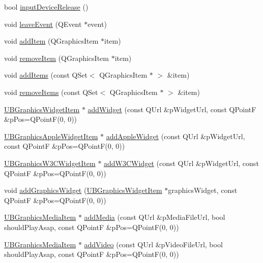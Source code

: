 \begin{DoxyCompactItemize}
\item 
bool \hyperlink{class_u_b_graphics_scene_a6e04dca4d1484c4e44cc63c8a5b0e2da}{input\-Device\-Release} ()
\item 
void \hyperlink{class_u_b_graphics_scene_ad531983c966ef07c7dde8cebf8cf3903}{leave\-Event} (Q\-Event $\ast$event)
\item 
void \hyperlink{class_u_b_graphics_scene_a546b3015e60c63f2ef0e72fed5e4eb35}{add\-Item} (Q\-Graphics\-Item $\ast$item)
\item 
void \hyperlink{class_u_b_graphics_scene_a769a40e7bebcaf040e391eed5f5d3f56}{remove\-Item} (Q\-Graphics\-Item $\ast$item)
\item 
void \hyperlink{class_u_b_graphics_scene_a18bf3af9f52c9deb3149d9b82409cc02}{add\-Items} (const Q\-Set$<$ Q\-Graphics\-Item $\ast$ $>$ \&item)
\item 
void \hyperlink{class_u_b_graphics_scene_a51dd0fbb2c591323cddfcc14972b8594}{remove\-Items} (const Q\-Set$<$ Q\-Graphics\-Item $\ast$ $>$ \&item)
\item 
\hyperlink{class_u_b_graphics_widget_item}{U\-B\-Graphics\-Widget\-Item} $\ast$ \hyperlink{class_u_b_graphics_scene_aff586f570c8625a51bccef943662a29d}{add\-Widget} (const Q\-Url \&p\-Widget\-Url, const Q\-Point\-F \&p\-Pos=Q\-Point\-F(0, 0))
\item 
\hyperlink{class_u_b_graphics_apple_widget_item}{U\-B\-Graphics\-Apple\-Widget\-Item} $\ast$ \hyperlink{class_u_b_graphics_scene_aa86ec061e79ba18c2efe73a6bf10bf33}{add\-Apple\-Widget} (const Q\-Url \&p\-Widget\-Url, const Q\-Point\-F \&p\-Pos=Q\-Point\-F(0, 0))
\item 
\hyperlink{class_u_b_graphics_w3_c_widget_item}{U\-B\-Graphics\-W3\-C\-Widget\-Item} $\ast$ \hyperlink{class_u_b_graphics_scene_acb26de2926454faf9c5ca66989779d82}{add\-W3\-C\-Widget} (const Q\-Url \&p\-Widget\-Url, const Q\-Point\-F \&p\-Pos=Q\-Point\-F(0, 0))
\item 
void \hyperlink{class_u_b_graphics_scene_aa63a9c1b5eb1de5a0d06a0f2b449648a}{add\-Graphics\-Widget} (\hyperlink{class_u_b_graphics_widget_item}{U\-B\-Graphics\-Widget\-Item} $\ast$graphics\-Widget, const Q\-Point\-F \&p\-Pos=Q\-Point\-F(0, 0))
\item 
\hyperlink{class_u_b_graphics_media_item}{U\-B\-Graphics\-Media\-Item} $\ast$ \hyperlink{class_u_b_graphics_scene_a02401493ef5bda150a808a6a92223386}{add\-Media} (const Q\-Url \&p\-Media\-File\-Url, bool should\-Play\-Asap, const Q\-Point\-F \&p\-Pos=Q\-Point\-F(0, 0))
\item 
\hyperlink{class_u_b_graphics_media_item}{U\-B\-Graphics\-Media\-Item} $\ast$ \hyperlink{class_u_b_graphics_scene_a8b4f713ed62bc53e6b4f884ac0abc29f}{add\-Video} (const Q\-Url \&p\-Video\-File\-Url, bool should\-Play\-Asap, const Q\-Point\-F \&p\-Pos=Q\-Point\-F(0, 0))

\end{DoxyCompactItemize}

